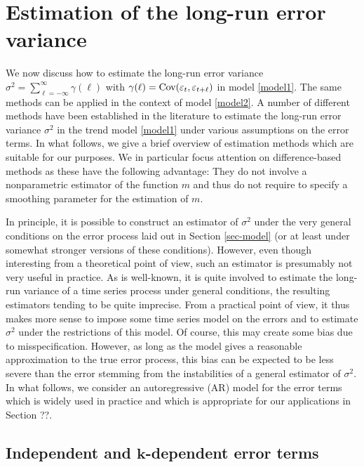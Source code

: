 \documentclass[a4paper,12pt]{article}
\numberwithin{equation}{section}
\begin{document}
\section{Estimation of the long-run error variance}\label{sec-error-var}


We now discuss how to estimate the long-run error variance $\sigma^2 = \sum\nolimits_{\ell=-\infty}^{\infty} \gamma(\ell)$ with $\gamma(\ell) = \textnormal{Cov}(\varepsilon_t,\varepsilon_{t+\ell})$ in model \eqref{model1}. The same methods can be applied in the context of model \eqref{model2}. A number of different methods have been established in the literature to estimate the long-run error variance $\sigma^2$ in the trend model \eqref{model1} under various assumptions on the error terms. In what follows, we give a brief overview of estimation methods which are suitable for our purposes. We in particular focus attention on difference-based methods as these have the following advantage: They do not involve a nonparametric estimator of the function $m$ and thus do not require to specify a smoothing parameter for the estimation of $m$. 


In principle, it is possible to construct an estimator of $\sigma^2$ under the very general conditions on the error process laid out in Section \ref{sec-model} (or at least under somewhat stronger versions of these conditions). However, even though interesting from a theoretical point of view, such an estimator is presumably not very useful in practice. As is well-known, it is quite involved to estimate the long-run variance of a time series process under general conditions, the resulting estimators tending to be quite imprecise. From a practical point of view, it thus makes more sense to impose some time series model on the errors and to estimate $\sigma^2$ under the restrictions of this model. Of course, this may create some bias due to misspecification. However, as long as the model gives a reasonable approximation to the true error process, this bias can be expected to be less severe than the error stemming from the instabilities of a general estimator of $\sigma^2$. In what follows, we consider an autoregressive (AR) model for the error terms which is widely used in practice and which is appropriate for our applications in Section ??. 


\subsection{Independent and $\boldsymbol{k}$-dependent error terms} 
\end{document}
